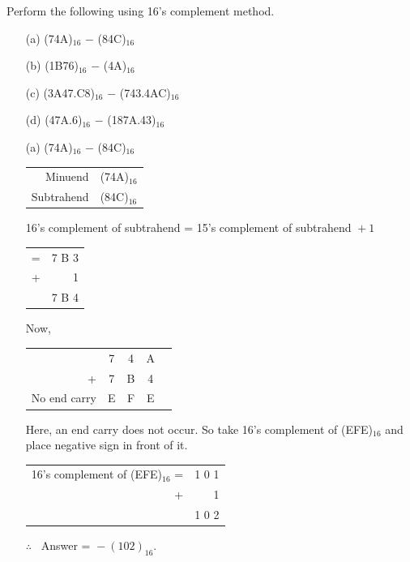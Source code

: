 \begin{problem}\label{prob5.42}
Perform the following using 16's complement method.
\begin{itemize}
\item[(a)] (74A)$_{16}$ $-$ (84C)$_{16}$

\item[(b)] (1B76)$_{16}$ $-$ (4A)$_{16}$

\item[(c)] (3A47.C8)$_{16}$ $-$ (743.4AC)$_{16}$

\item[(d)] (47A.6)$_{16}$ $-$ (187A.43)$_{16}$
\end{itemize}
\end{problem}

\eject

\begin{solution}
\begin{itemize}
\item[(a)] (74A)$_{16}$ $-$ (84C)$_{16}$
\begin{center}
\begin{tabular}{r@{\;=\;}l}
Minuend & (74A)$_{16}$\\
Subtrahend & (84C)$_{16}$
\end{tabular}
\end{center}
16's complement of subtrahend = 15's complement of subtrahend ${}+1$

\smallskip
\begin{tabular}{@{\hspace{4.95cm}}rr}
= & 7 B 3\\
+ & 1\\
\cline{2-2}
 & 7 B 4
\end{tabular}

Now,
\begin{center}
\begin{tabular}{rcccr}
 & 7 & 4 & A &\\
+ & 7 & B & 4 & \\
\cline{2-4}
No end carry & E & F & E & \qquad\qquad
\end{tabular}
\end{center}

Here, an end carry does not occur. So take 16's complement of (EFE)$_{16}$ and place negative sign in front of it.
\begin{center}
\begin{tabular}{rr}
16's complement of (EFE)$_{16}$ = & 1  0  1\\
                + &  1\\
\cline{2-2}
 & 1 0  2
\end{tabular}
\end{center}
$\therefore$~ Answer = ${}-(102)_{16}$.


\end{itemize}
\end{solution}
